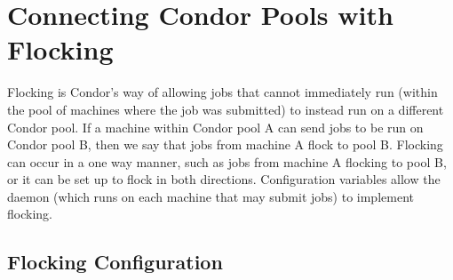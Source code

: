 \section{\label{sec:Flocking}Connecting Condor Pools with Flocking}

Flocking is Condor's way of allowing jobs that cannot immediately
run (within the pool of machines where the job was
submitted) to instead run on a different Condor pool. 
If a machine within Condor pool A can send jobs to be run on Condor pool B,
then we say that jobs from machine A flock to pool B.
Flocking can occur in a one way manner,
such as jobs from machine A flocking to pool B,
or it can be set up to flock in both directions. 
Configuration variables allow the
 daemon (which runs on each machine
that may submit jobs) to implement flocking.

\subsection{\label{sec:Configure-Flocking}Flocking Configuration}

